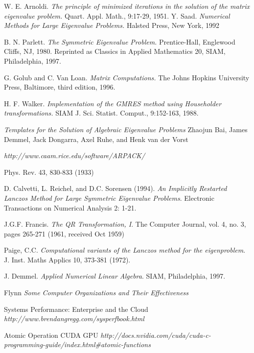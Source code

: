 \documentclass[a4paper,openright, 12pt, oneside]{book}
\begin{document}
\begin{thebibliography}{X}
    W. E. Arnoldi. 
    \emph{The principle of minimized iterations in the solution of the matrix eigenvalue problem.} 
    Quart. Appl. Math., 9:17-29, 1951.
    Y. Saad. 
    \emph{Numerical Methods for Large Eigenvalue Problems.}
    Halsted Press, New York, 1992

    B. N. Parlett. 
    \emph{The Symmetric Eigenvalue Problem.}
    Prentice-Hall, Englewood Cliffs, NJ, 1980. 
    Reprinted as Classics in Applied Mathematics 20, SIAM, Philadelphia, 1997.

    G. Golub and C. Van Loan. 
    \emph{Matrix Computations.}
    The Johns Hopkins University Press, Baltimore, third edition, 1996.

    H. F. Walker. 
    \emph{Implementation of the GMRES method using Householder transformations.}
    SIAM J. Sci. Statist. Comput., 9:152-163, 1988.

    \emph{Templates for the Solution of Algebraic Eigenvalue Problems}
    Zhaojun Bai, James Demmel, Jack Dongarra, Axel Ruhe, and Henk van der Vorst

    \emph{http://www.caam.rice.edu/software/ARPACK/}

    Phys. Rev. 43, 830-833 (1933)

    D. Calvetti, L. Reichel, and D.C. Sorensen (1994). 
    \emph{An Implicitly Restarted Lanczos Method for Large Symmetric Eigenvalue Problems}. 
    Electronic Transactions on Numerical Analysis 2: 1-21.

    J.G.F. Francis.
    \emph {The QR Transformation, I}.
    The Computer Journal, vol. 4, no. 3, pages 265-271 (1961, received Oct 1959) 

    Paige, C.C. 
    \emph{Computational variants of the Lanczos method for the eigenproblem}.
    J. Inst. Maths Applics 10, 373-381 (1972).

    J. Demmel. 
    \emph{Applied Numerical Linear Algebra}.
    SIAM, Philadelphia, 1997.

  Flynn
  \emph{Some Computer Organizations and Their Effectiveness}

  Systems Performance: Enterprise and the Cloud
  \emph{http://www.brendangregg.com/sysperfbook.html}

  Atomic Operation CUDA GPU
  \emph{http://docs.nvidia.com/cuda/cuda-c-programming-guide/index.html\#atomic-functions}

\end{thebibliography}

%
%

\end{document}
